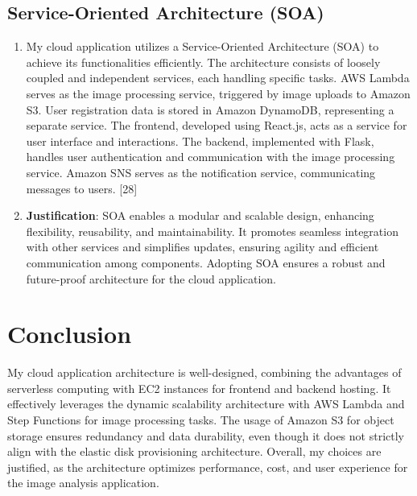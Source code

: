 \subsection{Service-Oriented Architecture (SOA)}
\begin{enumerate}
    \item My cloud application utilizes a Service-Oriented Architecture (SOA) to achieve its functionalities efficiently. The architecture consists of loosely coupled and independent services, each handling specific tasks. AWS Lambda serves as the image processing service, triggered by image uploads to Amazon S3. User registration data is stored in Amazon DynamoDB, representing a separate service. The frontend, developed using React.js, acts as a service for user interface and interactions. The backend, implemented with Flask, handles user authentication and communication with the image processing service. Amazon SNS serves as the notification service, communicating messages to users. [28]
    
    \item \textbf{Justification}: SOA enables a modular and scalable design, enhancing flexibility, reusability, and maintainability. It promotes seamless integration with other services and simplifies updates, ensuring agility and efficient communication among components. Adopting SOA ensures a robust and future-proof architecture for the cloud application.
\end{enumerate}


\section{Conclusion}
My cloud application architecture is well-designed, combining the advantages of serverless computing with EC2 instances for frontend and backend hosting. It effectively leverages the dynamic scalability architecture with AWS Lambda and Step Functions for image processing tasks. The usage of Amazon S3 for object storage ensures redundancy and data durability, even though it does not strictly align with the elastic disk provisioning architecture. Overall, my choices are justified, as the architecture optimizes performance, cost, and user experience for the image analysis application.



\newpage

